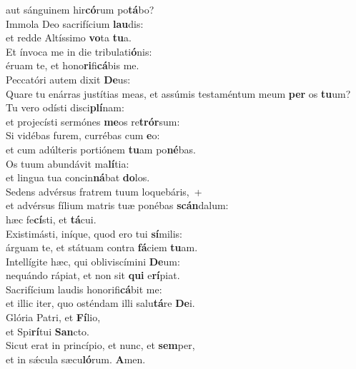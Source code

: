 \evenverse aut sánguinem hir\textbf{có}rum po\textbf{tá}bo?\\
\oddverse Immola Deo sacrifícium \textbf{lau}dis:~\*\\
\oddverse et redde Altíssimo \textbf{vo}ta \textbf{tu}a.\\
\evenverse Et ínvoca me in die tribulati\textbf{ó}nis:~\*\\
\evenverse éruam te, et hono\textbf{ri}fi\textbf{cá}bis me.\\
\oddverse Peccatóri autem dixit \textbf{De}us:~\*\\
\oddverse Quare tu enárras justítias meas, et assúmis testaméntum meum \textbf{per} os \textbf{tu}um?\\
\evenverse Tu vero odísti disci\textbf{plí}nam:~\*\\
\evenverse et projecísti sermónes \textbf{me}os re\textbf{trór}sum:\\
\oddverse Si vidébas furem, currébas cum \textbf{e}o:~\*\\
\oddverse et cum adúlteris portiónem \textbf{tu}am po\textbf{né}bas.\\
\evenverse Os tuum abundávit ma\textbf{lí}tia:~\*\\
\evenverse et lingua tua concin\textbf{ná}bat \textbf{do}los.\\
\oddverse Sedens advérsus fratrem tuum loquebáris,~+\\
\oddverse  et advérsus fílium matris tuæ ponébas \textbf{scán}dalum:~\*\\
\oddverse hæc fe\textbf{cí}sti, et \textbf{tá}cui.\\
\evenverse Existimásti, iníque, quod ero tui \textbf{sí}milis:~\*\\
\evenverse árguam te, et státuam contra \textbf{fá}ciem \textbf{tu}am.\\
\oddverse Intellígite hæc, qui obliviscímini \textbf{De}um:~\*\\
\oddverse nequándo rápiat, et non sit \textbf{qui} e\textbf{rí}piat.\\
\evenverse Sacrifícium laudis honorifi\textbf{cá}bit me:~\*\\
\evenverse et illic iter, quo osténdam illi salu\textbf{tá}re \textbf{De}i.\\
\oddverse Glória Patri, et \textbf{Fí}lio,~\*\\
\oddverse et Spi\textbf{rí}tui \textbf{San}cto.\\
\evenverse Sicut erat in princípio, et nunc, et \textbf{sem}per,~\*\\
\evenverse et in sǽcula sæcu\textbf{ló}rum. \textbf{A}men.\\
